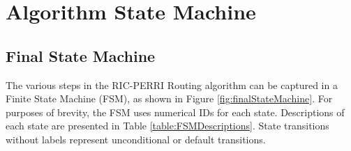 \section{Algorithm State Machine}\label{sec:stateMachine}
\subsection{Final State Machine}\label{subsec:SMfinalStateMachine}
The various steps in the RIC-PERRI Routing algorithm can be captured in a Finite State Machine (FSM), as shown in Figure \ref{fig:finalStateMachine}. For purposes of brevity, the FSM uses numerical IDs for each state. Descriptions of each state are presented in Table \ref{table:FSMDescriptions}. State transitions without labels represent unconditional or default transitions.

